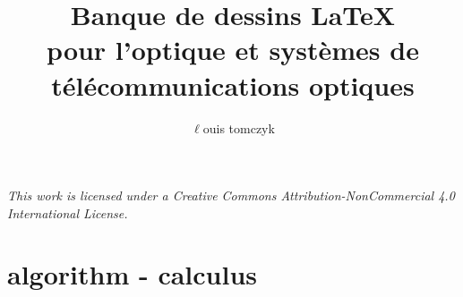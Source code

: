 \documentclass{article}
\title{%
  Banque de dessins \LaTeX{}\\
  \large pour l'optique et systèmes de télécommunications optiques}
\author{$\ell$ouis tomczyk}
\begin{document}
\maketitle
\doclicenseThis
\noindent\textit{This work is licensed under a Creative Commons Attribution-NonCommercial 4.0 International License.}



\tableofcontents
\centering

\newpage
\section{algorithm - calculus}

%


































\end{document}
